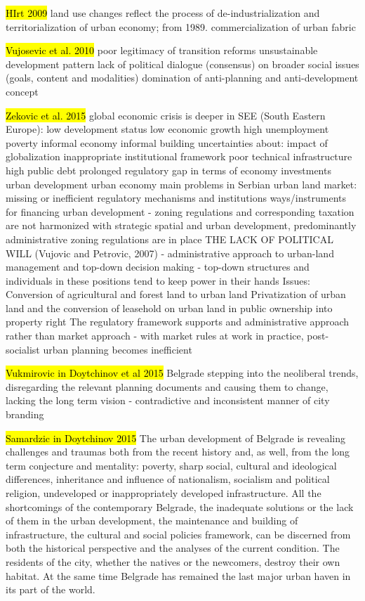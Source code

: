 \documentclass[11pt]{report}
\begin{document}
\hl{HIrt 2009}
land use changes reflect the process of de-industrialization and territorialization of urban economy;
from 1989. commercialization of urban fabric

\hl{Vujosevic et al. 2010}
poor legitimacy of transition reforms
unsustainable development pattern
lack of political dialogue (consensus) on broader social issues (goals, content and modalities)
domination of anti-planning and anti-development concept

\hl{Zekovic et al. 2015}
global economic crisis is deeper in SEE (South Eastern Europe):
    low development status
    low economic growth
    high unemployment
    poverty
    informal economy
    informal building
    uncertainties about:
        impact of globalization
        inappropriate institutional framework
        poor technical infrastructure
        high public debt
    prolonged regulatory gap in terms of
        economy
        investments
        urban development
        urban economy
main problems in Serbian urban land market:
    missing or inefficient regulatory mechanisms and institutions
    ways/instruments for financing urban development
- zoning regulations and corresponding taxation are not harmonized with strategic spatial and urban development, predominantly administrative zoning regulations are in place
THE LACK OF POLITICAL WILL (Vujovic and Petrovic, 2007) - administrative approach to urban-land management and top-down decision making - top-down structures and individuals in these positions tend to keep power in their hands
Issues:
    Conversion of agricultural and forest land to urban land
    Privatization of urban land and the conversion of leasehold on urban land in public ownership into property right
The regulatory framework supports and administrative approach rather than market approach
- with market rules at work in practice, post-socialist urban planning becomes inefficient

	\hl{Vukmirovic in Doytchinov et al 2015}
Belgrade stepping into the neoliberal trends, disregarding the relevant planning documents and causing them to change, lacking the long term vision - contradictive and inconsistent manner of  city branding

\hl{Samardzic in Doytchinov 2015} 
The  urban  development  of  Belgrade  is  revealing  challenges  and  traumas both from the recent history and, as well, from the long term conjecture and mentality: poverty, sharp social, cultural and ideological differences, inheritance and influence of nationalism, socialism and political religion, undeveloped or inappropriately developed infrastructure.
All the shortcomings of the contemporary Belgrade, the inadequate solutions or the lack of them in the urban development, the maintenance and building of infrastructure, the cultural and social policies framework, can be discerned from both the historical perspective and the analyses of the current condition. 
The residents of the city, whether the natives or the newcomers, destroy their own habitat. At the same time Belgrade has remained the last major urban haven in its part of the world. 
\end{document}
